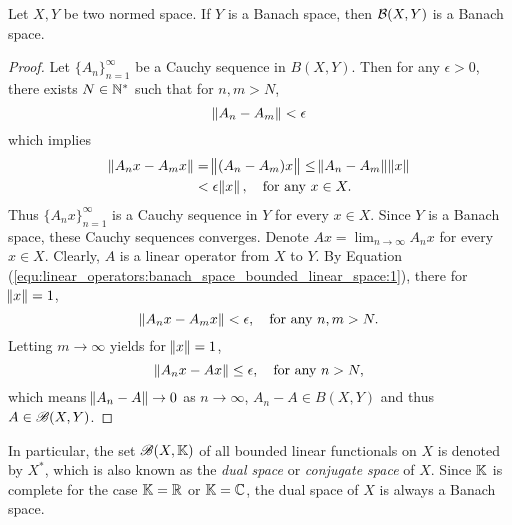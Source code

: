 \begin{thm}
\label{thm:linear_operators:completeness_bounded_linear_spaces_operator_norm}
Let $X, Y$ be two normed space. 
If $Y$ is a Banach space, then $\mathcal{B}(X, Y)$ is a Banach space. 
\end{thm}
\begin{proof}
Let $\{ A_n \}_{n=1}^{\infty}$ be a Cauchy sequence in $B(X, Y)$. 
Then for any $\epsilon > 0$, there exists $N \in \mathbb{N}^\ast$ such that 
for $n, m > N$, 
\begin{equation}
    \label{equ:linear_operators:banach_space_bounded_linear_space:1}
    \norm{A_n - A_m} < \epsilon
\end{equation}
which implies 
\begin{equation*}
    \begin{aligned}
        \norm{A_n x - A_m x} &= \norm{(A_n - A_m)x} 
        \le \norm{A_n - A_m} \norm{x} \\ 
        &< \epsilon \norm{x}, \quad \text{for any } x \in X. 
    \end{aligned}
\end{equation*}
Thus $\{ A_nx \}_{n=1}^{\infty}$ is a Cauchy sequence in $Y$ for every $x \in X$. 
Since $Y$ is a Banach space, these Cauchy sequences converges. 
Denote $Ax = \lim_{n \to \infty} A_n x$ for every $x \in X$. 
Clearly, $A$ is a linear operator from $X$ to $Y$. 
By Equation 
(\ref{equ:linear_operators:banach_space_bounded_linear_space:1}), there 
for $\norm{x} = 1$, 
\begin{equation*}
    \norm{A_nx - A_m x} < \epsilon, \quad \text{for any } n, m > N. 
\end{equation*} 
Letting $m \to \infty$ yields for $\norm{x} = 1$, 
\begin{equation*}
    \norm{A_n x - Ax} \le \epsilon, \quad \text{for any } n > N, 
\end{equation*}
which means $\norm{A_n - A} \to 0$ as $n \to \infty$, $A_n - A \in B(X, Y)$ 
and thus $A \in \mathscr{B}(X, Y)$. 
\end{proof}

In particular, the set $\mathscr{B}(X, \mathbb{K})$ of all bounded linear functionals on 
$X$ is denoted by $X^\ast$, which is also known as the \emph{dual space} or 
\emph{conjugate space} of $X$. 
Since $\mathbb{K}$ is complete for the case $\mathbb{K} = \mathbb{R}$ or $\mathbb{K} = \mathbb{C}$, the dual 
space of $X$ is always a Banach space. 

